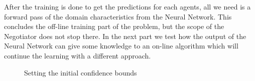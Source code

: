 After the training is done to get the predictions for each agents, 
all we need is a forward pass of the domain characteristics from the Neural Network. 
This concludes the off-line training part of the problem, but the scope of the Negotiator does not stop there.
In the next part we test how the output of the Neural Network can give some knowledge to an on-line algorithm 
which will continue the learning with a different approach.
\begin{figure}[H]
	\centering
	\captionsetup{justification=centering}
	\caption{Setting the initial confidence bounds}
	\label{fig:Setting the initial confidence bounds}
\end{figure}
 